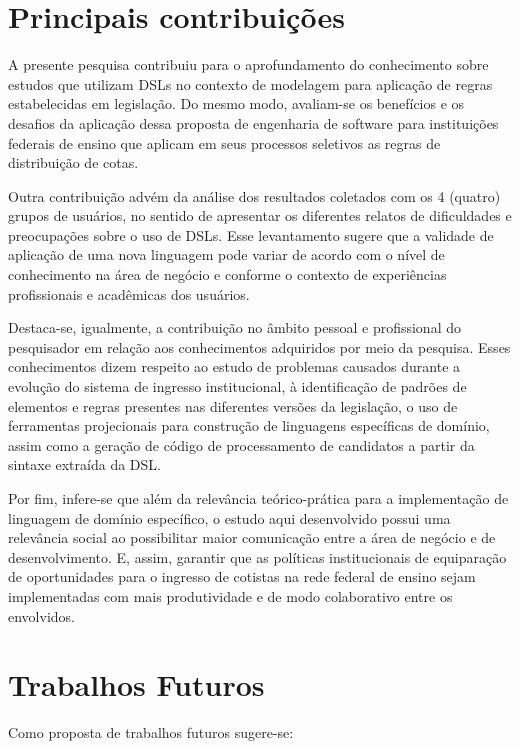 \section{Principais contribuições}
\label{principaiscontribuicoes}

A presente pesquisa contribuiu para o aprofundamento do conhecimento sobre estudos que utilizam \gls{DSL}s no contexto de modelagem para aplicação de regras estabelecidas em legislação. Do mesmo modo, avaliam-se os benefícios e os desafios da aplicação dessa proposta de engenharia de software para instituições federais de ensino que aplicam em seus processos seletivos as regras de distribuição de cotas. 

Outra contribuição advém da análise dos resultados coletados com os 4 (quatro) grupos de usuários, no sentido de apresentar os diferentes relatos de dificuldades e preocupações sobre o uso de DSLs. Esse levantamento sugere que a validade de aplicação de uma nova linguagem pode variar de acordo com o nível de conhecimento na área de negócio e conforme o contexto de experiências profissionais e acadêmicas dos usuários.

Destaca-se, igualmente, a contribuição no âmbito pessoal e profissional do pesquisador em relação aos conhecimentos adquiridos por meio da pesquisa. Esses conhecimentos dizem respeito ao estudo de problemas causados durante a evolução do sistema de ingresso institucional, à identificação de padrões de elementos e regras presentes nas diferentes versões da legislação, o uso de ferramentas projecionais para construção de linguagens específicas de domínio, assim como a geração de código de processamento de candidatos a partir da sintaxe extraída da DSL.

Por fim, infere-se que além da relevância teórico-prática para a implementação de linguagem de domínio específico, o estudo aqui desenvolvido possui uma relevância social ao possibilitar maior comunicação entre a área de negócio e de desenvolvimento. E, assim, garantir que as políticas institucionais de equiparação de oportunidades para o ingresso de cotistas na rede federal de ensino sejam implementadas com mais produtividade e de modo colaborativo entre os envolvidos.   

\section{Trabalhos Futuros}
\label{trabalhosfuturos}

Como proposta de trabalhos futuros sugere-se:

